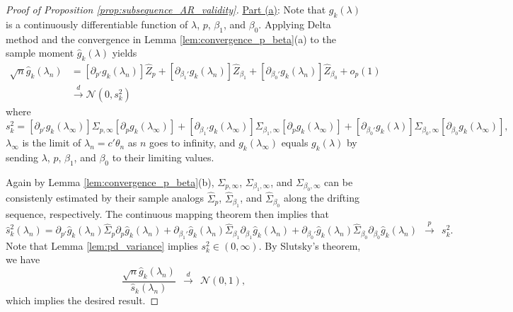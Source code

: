 \documentclass[11pt]{article}
\theoremstyle{definition}
\newcommand{\0}{\ensuremath{\mathbf{0}}}
\newcommand{\normal}{\ensuremath{\mathcal{N}}}
\begin{document}
\begin{bibunit}
\begin{proof}[Proof of Proposition \ref{prop:subsequence_AR_validity}]
\medskip
\underline{Part (a)}: 
Note that $g_k(\lambda)$ is a continuously differentiable function of $\lambda$, $p$, $\beta_1$, and $\beta_0$. Applying Delta method and the convergence in Lemma \ref{lem:convergence_p_beta}(a) to the sample moment $\hat{g}_k(\lambda)$ yields
\begin{align*}
    \sqrt{n}\hat{g}_k(\lambda_{n})
    & = [\partial_{p'}{g}_k(\lambda_n)] \hat{Z}_p + [\partial_{\beta_1'}{g}_k(\lambda_n)] \hat{Z}_{\beta_1} + [\partial_{\beta_0'}{g}_k(\lambda_n)] \hat{Z}_{\beta_0} + o_p(1) \\
    & \xrightarrow{d} \normal(0, s_k^2)
\end{align*}
where 
\[
    s_k^2 = [\partial_{p'}{g}_k(\lambda_\infty)]\Sigma_{p,\infty}[\partial_{p}{g}_k(\lambda_\infty)] + [\partial_{\beta_1'}{g}_k(\lambda_\infty)]\Sigma_{\beta_1,\infty}[\partial_{p}{g}_k(\lambda_\infty)] + [\partial_{\beta_0'}{g}_k(\lambda)]\Sigma_{\beta_0,\infty}[\partial_{\beta_0}{g}_k(\lambda_\infty)],
\]
$\lambda_\infty$ is the limit of $\lambda_n = c'\theta_n$ as $n$ goes to infinity, and $g_k(\lambda_\infty)$ equals $g_k(\lambda)$ by sending $\lambda$, $p$, $\beta_1$, and $\beta_0$ to their limiting values.

Again by Lemma \ref{lem:convergence_p_beta}(b), $\Sigma_{p,\infty}$, $\Sigma_{\beta_1,\infty}$, and $\Sigma_{\beta_0,\infty}$ can be consistenly estimated by their sample analogs $\hat{\Sigma}_p$, $\hat{\Sigma}_{\beta_1}$, and $\hat{\Sigma}_{\beta_0}$ along the drifting sequence, respectively. The continuous mapping theorem then implies that 
\[
    \hat{s}_{k}^2(\lambda_{n}) 
    = \partial_{p'}\hat{g}_k(\lambda_{n}) \hat{\Sigma}_p \partial_{p}\hat{g}_k(\lambda_{n}) +  \partial_{\beta_1'}\hat{g}_k(\lambda_{n}) \hat{\Sigma}_{\beta_1} \partial_{\beta_1}\hat{g}_k(\lambda_{n}) +  \partial_{\beta_0'}\hat{g}_k(\lambda_{n}) \hat{\Sigma}_{\beta_0} \partial_{\beta_0}\hat{g}_k(\lambda_{n}) ~~\xrightarrow{p}~~ s_k^2.
\]
Note that Lemma \ref{lem:pd_variance} implies $s_k^2 \in (0,\infty)$. By Slutsky's theorem, we have
\[
    \frac{\sqrt{n}\hat{g}_k(\lambda_{n})}{\hat{s}_k(\lambda_{n})} ~~\xrightarrow{d}~~ \normal(0,1),
\]
which implies the desired result.


\end{proof}
\end{bibunit}
\end{document}
